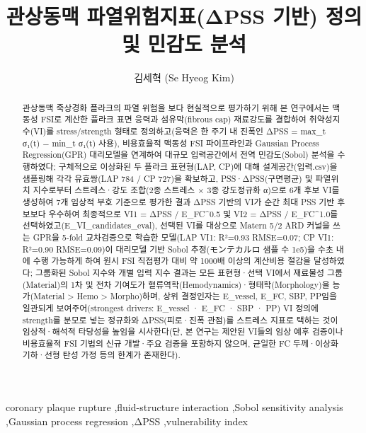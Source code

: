 \documentclass[preprint,12pt]{elsarticle}
\begin{document}
\begin{frontmatter}
\title{관상동맥 파열위험지표(ΔPSS 기반) 정의 및 민감도 분석}
\author[label1]{김세혁 (Se Hyeog Kim)}
\begin{abstract}
관상동맥 죽상경화 플라크의 파열 위험을 보다 현실적으로 평가하기 위해 본 연구에서는 맥동성 FSI로 계산한 플라크 표면 응력과 섬유막(fibrous cap) 재료강도를 결합하여 취약성지수(VI)를 stress/strength 형태로 정의하고(응력은 한 주기 내 진폭인 ΔPSS = max\_t σ₁(t) − min\_t σ₁(t) 사용), 비용효율적 맥동성 FSI 파이프라인과 Gaussian Process Regression(GPR) 대리모델을 연계하여 대규모 입력공간에서 전역 민감도(Sobol) 분석을 수행하였다; 구체적으로 이상화된 두 플라크 표현형(LAP, CP)에 대해 설계공간(입력.csv)을 샘플링해 각각 유효쌍(LAP 784 / CP 727)을 확보하고, PSS·ΔPSS(구면평균) 및 파열위치 지수로부터 스트레스·강도 조합(2종 스트레스 × 3종 강도정규화 α)으로 6개 후보 VI를 생성하여 7개 임상적 부호 기준으로 평가한 결과 ΔPSS 기반의 VI가 순간 최대 PSS 기반 후보보다 우수하여 최종적으로 VI1 = ΔPSS / E\_FC\textasciicircum {0.5} 및 VI2 = ΔPSS / E\_FC\textasciicircum {1.0}를 선택하였고(E\_VI\_candidates\_eval), 선택된 VI를 대상으로 Matern 5/2 ARD 커널을 쓰는 GPR을 5-fold 교차검증으로 학습한 모델(LAP VI1: R²=0.93 RMSE=0.07; CP VI1: R²=0.90 RMSE=0.09)이 대리모델 기반 Sobol 추정(モンテカルロ 샘플 수 1e5)을 수초 내에 수행 가능하게 하여 원시 FSI 직접평가 대비 약 1000배 이상의 계산비용 절감을 달성하였다; 그룹화된 Sobol 지수와 개별 입력 지수 결과는 모든 표현형·선택 VI에서 재료물성 그룹(Material)의 1차 및 전차 기여도가 혈류역학(Hemodynamics)·형태학(Morphology)을 능가(Material > Hemo > Morpho)하며, 상위 결정인자는 E\_vessel, E\_FC, SBP, PP임을 일관되게 보여주어(strongest drivers: E\_vessel · E\_FC · SBP · PP) VI 정의에 strength를 분모로 넣는 정규화와 ΔPSS(피로·진폭 관점)를 스트레스 지표로 택하는 것이 임상적·해석적 타당성을 높임을 시사한다(단, 본 연구는 제안된 VI들의 임상 예후 검증이나 비용효율적 FSI 기법의 신규 개발·주요 검증을 포함하지 않으며, 균일한 FC 두께·이상화 기하·선형 탄성 가정 등의 한계가 존재한다).
\end{abstract}
\begin{keyword}
coronary plaque rupture \sep fluid-structure interaction \sep Sobol sensitivity analysis \sep Gaussian process regression \sep ΔPSS \sep vulnerability index
\end{keyword}
\end{frontmatter}
\end{document}
